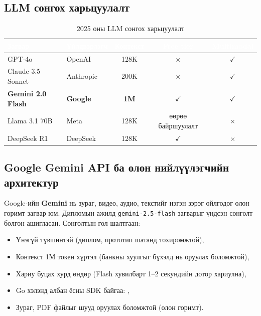 \subsection{LLM сонгох харьцуулалт}

\begin{table}[ht]
\centering
\footnotesize
\renewcommand{\arraystretch}{1.3}
\begin{tabular}{|p{2.6cm}|p{2.6cm}|c|c|c|}
\hline
\rowcolor{darknavy}
\textcolor{white}{\textbf{Загвар}} & \textcolor{white}{\textbf{Үйлдвэрлэгч}} & \textcolor{white}{\textbf{Контекст}} & \textcolor{white}{\textbf{Free tier}} & \textcolor{white}{\textbf{Multimodal}} \\ \hline
GPT-4o                  & OpenAI    & 128K       & $\times$      & $\checkmark$ \\ \hline
Claude 3.5 Sonnet       & Anthropic & 200K       & $\times$      & $\checkmark$ \\ \hline
\textbf{Gemini 2.0 Flash} & \textbf{Google} & \textbf{1M} & $\checkmark$ & $\checkmark$ \\ \hline
Llama 3.1 70B           & Meta      & 128K       & өөрөө байршуулалт    & $\times$ \\ \hline
DeepSeek R1             & DeepSeek  & 128K       & $\checkmark$  & $\times$ \\ \hline
\end{tabular}
\caption{2025 оны LLM сонгох харьцуулалт}
\label{tab:llm-cmp}
\end{table}

\subsection{Google Gemini API ба олон нийлүүлэгчийн архитектур}
Google-ийн \textbf{Gemini} нь зураг, видео, аудио, текстийг нэгэн зэрэг ойлгодог олон горимт загвар юм. Дипломын ажилд \texttt{gemini-2.5-flash} загварыг үндсэн сонголт болгон ашигласан. Сонголтын гол шалтгаан:
\begin{itemize}
    \item Үнэгүй түвшинтэй (диплом, прототип шатанд тохиромжтой),
    \item Контекст 1М токен хүртэл (банкны хуулгыг бүхэлд нь оруулах боломжтой),
    \item Хариу буцах хурд өндөр (Flash хувилбарт 1--2 секундийн дотор хариулна),
    \item Go хэлэнд албан ёсны SDK байгаа: ,
    \item Зураг, PDF файлыг шууд оруулах боломжтой (олон горимт).
\end{itemize}

